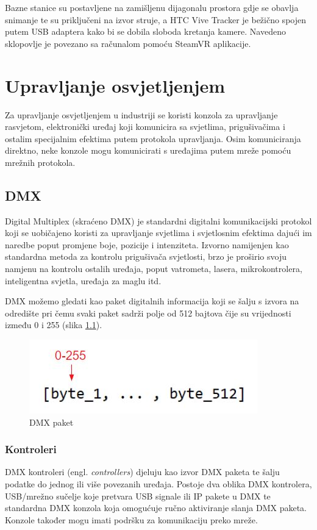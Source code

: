 \documentclass[times, utf8, zavrsni, numeric]{fer}
\begin{document}
Bazne stanice su postavljene na zamišljenu dijagonalu prostora gdje se obavlja snimanje te su priključeni na izvor struje, a HTC Vive Tracker je bežično spojen putem USB adaptera kako bi se dobila sloboda kretanja kamere. Navedeno sklopovlje je povezano sa računalom pomoću SteamVR aplikacije. \cite{vp}

\chapter{Upravljanje osvjetljenjem}
Za upravljanje osvjetljenjem u industriji se koristi konzola za upravljanje rasvjetom, elektronički uređaj koji komunicira sa svjetlima, prigušivačima i ostalim specijalnim efektima putem protokola upravljanja. Osim komuniciranja direktno, neke konzole mogu komunicirati s uređajima putem mreže pomoću mrežnih protokola.

\section{DMX}
Digital Multiplex (skraćeno DMX) je standardni digitalni komunikacijski protokol koji se uobičajeno koristi za upravljanje svjetlima i svjetlosnim efektima dajući im naredbe poput promjene boje, pozicije i intenziteta. Izvorno namijenjen kao standardna metoda za kontrolu prigušivača svjetlosti, brzo je proširio svoju namjenu na kontrolu ostalih uređaja, poput vatrometa, lasera, mikrokontrolera, inteligentna svjetla, uređaja za maglu itd.\newline

DMX možemo gledati kao paket digitalnih informacija koji se šalju s izvora na odredište pri čemu svaki paket sadrži polje od 512 bajtova čije su vrijednosti između 0 i 255 (slika \ref{fig:slika 3-1}).

\begin{figure}[htp]
	\centering
	\includegraphics[width=\linewidth]{slika 3-1.png}
	\caption{DMX paket \cite{dmx_overview}}
	\label{fig:slika 3-1}
\end{figure}

\subsection{Kontroleri}
DMX kontroleri (engl. \emph{controllers}) djeluju kao izvor DMX paketa te šalju podatke do jednog ili više povezanih uređaja. Postoje dva oblika DMX kontrolera, USB/mrežno sučelje koje pretvara USB signale ili IP pakete u DMX te standardna DMX konzola koja omogućuje ručno aktiviranje slanja DMX paketa. Konzole također mogu imati podršku za komunikaciju preko mreže.
\end{document}
